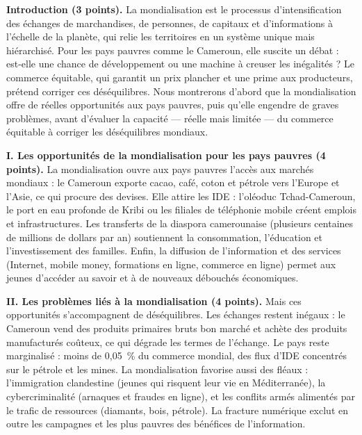 \documentclass[11pt]{article}
\begin{document}
\begin{corrige}
\textbf{Introduction (3 points).} La mondialisation est le processus d'intensification des échanges de marchandises, de personnes, de capitaux et d'informations à l'échelle de la planète, qui relie les territoires en un système unique mais hiérarchisé. Pour les pays pauvres comme le Cameroun, elle suscite un débat : est-elle une chance de développement ou une machine à creuser les inégalités ? Le commerce équitable, qui garantit un prix plancher et une prime aux producteurs, prétend corriger ces déséquilibres. Nous montrerons d'abord que la mondialisation offre de réelles opportunités aux pays pauvres, puis qu'elle engendre de graves problèmes, avant d'évaluer la capacité — réelle mais limitée — du commerce équitable à corriger les déséquilibres mondiaux.

\textbf{I. Les opportunités de la mondialisation pour les pays pauvres (4 points).} La mondialisation ouvre aux pays pauvres l'accès aux marchés mondiaux : le Cameroun exporte cacao, café, coton et pétrole vers l'Europe et l'Asie, ce qui procure des devises. Elle attire les IDE : l'oléoduc Tchad-Cameroun, le port en eau profonde de Kribi ou les filiales de téléphonie mobile créent emplois et infrastructures. Les transferts de la diaspora camerounaise (plusieurs centaines de millions de dollars par an) soutiennent la consommation, l'éducation et l'investissement des familles. Enfin, la diffusion de l'information et des services (Internet, mobile money, formations en ligne, commerce en ligne) permet aux jeunes d'accéder au savoir et à de nouveaux débouchés économiques.

\textbf{II. Les problèmes liés à la mondialisation (4 points).} Mais ces opportunités s'accompagnent de déséquilibres. Les échanges restent inégaux : le Cameroun vend des produits primaires bruts bon marché et achète des produits manufacturés coûteux, ce qui dégrade les termes de l'échange. Le pays reste marginalisé : moins de 0,05~\% du commerce mondial, des flux d'IDE concentrés sur le pétrole et les mines. La mondialisation favorise aussi des fléaux : l'immigration clandestine (jeunes qui risquent leur vie en Méditerranée), la cybercriminalité (arnaques et fraudes en ligne), et les conflits armés alimentés par le trafic de ressources (diamants, bois, pétrole). La fracture numérique exclut en outre les campagnes et les plus pauvres des bénéfices de l'information.


\end{corrige}
\end{document}

